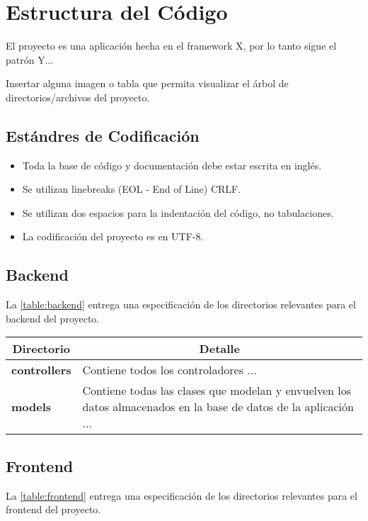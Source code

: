 \section{Estructura del Código}
El proyecto es una aplicación hecha en el framework X, por lo tanto sigue el patrón Y...

Insertar alguna imagen o tabla que permita visualizar el árbol de directorios/archivos del proyecto.

\subsection{Estándres de Codificación}

\begin{itemize}
  \item Toda la base de código y documentación debe estar escrita en inglés.
  \item Se utilizan linebreaks (EOL - End of Line) CRLF.
  \item Se utilizan dos espacios para la indentación del código, no tabulaciones.
  \item La codificación del proyecto es en UTF-8. 
\end{itemize}

\subsection{Backend}
La \autoref{table:backend} entrega una especificación de los directorios relevantes para el backend del proyecto.

\begin{center}
  \begin{tabular}{ | l | p{12.5cm} |}
    \hline
    \multicolumn{1}{|c|}{\textbf{Directorio}} & \multicolumn{1}{|c|}{\textbf{Detalle}} \\
    \hline
    
    {\textbf{controllers}} & Contiene todos los controladores ... \\ \hline
    
    {\textbf{models}} & Contiene todas las clases que modelan y envuelven los datos almacenados en la base de datos de la aplicación ... \\ \hline
  \end{tabular}
  
  \label{table:backend}
\end{center}

\subsection{Frontend}
La \autoref{table:frontend} entrega una especificación de los directorios relevantes para el frontend del proyecto.

